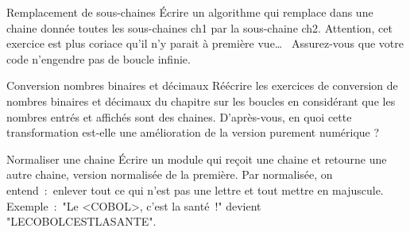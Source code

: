\begin{Exercice}{Remplacement de sous-chaines}
	Écrire un algorithme 
	qui remplace dans une chaine donnée 
	toutes les sous-chaines ch1 par la sous-chaine ch2. 
	Attention, 
	cet exercice est plus coriace qu'il n'y parait à première vue\dots~
	Assurez-vous que votre code n'engendre pas de boucle infinie. 
\end{Exercice}

\begin{Exercice}{Conversion nombres binaires et décimaux}
	Réécrire les exercices de conversion de nombres binaires et décimaux
	du chapitre sur les boucles 
	en considérant que les nombres entrés et affichés sont des chaines. 
	D'après-vous, 
	en quoi cette transformation 
	est-elle une amélioration de la version purement numérique ?
\end{Exercice}

\begin{Exercice}{Normaliser une chaine}
	Écrire un module qui reçoit une chaine et retourne une autre chaine,
	version normalisée de la première.
	Par normalisée, on entend~:~enlever tout ce qui n'est pas une lettre 
	et tout mettre en majuscule.
	\\Exemple~:~"Le <COBOL>, c'est la santé~!" devient "LECOBOLCESTLASANTE".
\end{Exercice}

